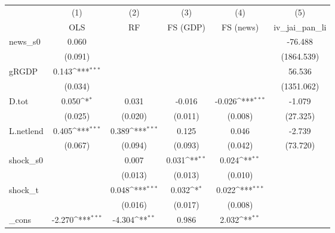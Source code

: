 {
\def\sym#1{\ifmmode^{#1}\else\(^{#1}\)\fi}
\begin{tabular}{l*{5}{c}}
\toprule
            &\multicolumn{1}{c}{(1)}&\multicolumn{1}{c}{(2)}&\multicolumn{1}{c}{(3)}&\multicolumn{1}{c}{(4)}&\multicolumn{1}{c}{(5)}\\
            &\multicolumn{1}{c}{OLS}&\multicolumn{1}{c}{RF}&\multicolumn{1}{c}{FS (GDP)}&\multicolumn{1}{c}{FS (news)}&\multicolumn{1}{c}{iv\_jai\_pan\_li}\\
\midrule
news\_s0     &       0.060         &                     &                     &                     &     -76.488         \\
            &     (0.091)         &                     &                     &                     &  (1864.539)         \\
\addlinespace
gRGDP       &       0.143\sym{***}&                     &                     &                     &      56.536         \\
            &     (0.034)         &                     &                     &                     &  (1351.062)         \\
\addlinespace
D.tot       &       0.050\sym{*}  &       0.031         &      -0.016         &      -0.026\sym{***}&      -1.079         \\
            &     (0.025)         &     (0.020)         &     (0.011)         &     (0.008)         &    (27.325)         \\
\addlinespace
L.netlend   &       0.405\sym{***}&       0.389\sym{***}&       0.125         &       0.046         &      -2.739         \\
            &     (0.067)         &     (0.094)         &     (0.093)         &     (0.042)         &    (73.720)         \\
\addlinespace
shock\_s0    &                     &       0.007         &       0.031\sym{**} &       0.024\sym{**} &                     \\
            &                     &     (0.013)         &     (0.013)         &     (0.010)         &                     \\
\addlinespace
shock\_t     &                     &       0.048\sym{***}&       0.032\sym{*}  &       0.022\sym{***}&                     \\
            &                     &     (0.016)         &     (0.017)         &     (0.008)         &                     \\
\addlinespace
\_cons      &      -2.270\sym{***}&      -4.304\sym{**} &       0.986         &       2.032\sym{**} &                     \\

\end{tabular}}
